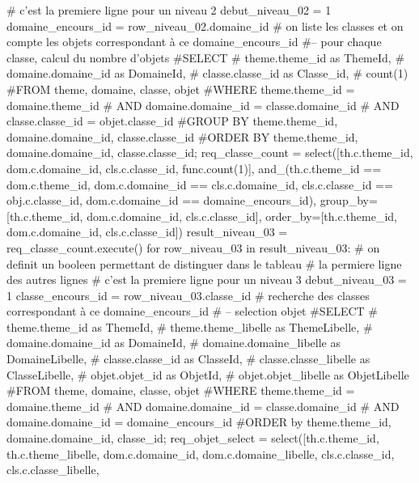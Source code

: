 \documentclass[12pt,titlepage,oneside]{book}
\begin{document}
\begin{lbdpython}
      # c'est la premiere ligne pour un niveau 2
      debut_niveau_02 = 1
      domaine_encours_id = row_niveau_02.domaine_id
      # on liste les classes et on compte les objets correspondant à ce domaine_encours_id
      #-- pour chaque classe, calcul du nombre d'objets
      #SELECT
      #   theme.theme_id as ThemeId,
      #   domaine.domaine_id as DomaineId,
      #   classe.classe_id as Classe_id,
      #   count(1)
      #FROM theme, domaine, classe, objet
      #WHERE theme.theme_id = domaine.theme_id 
      #  AND domaine.domaine_id = classe.domaine_id
      #  AND classe.classe_id = objet.classe_id
      #GROUP BY theme.theme_id, domaine.domaine_id, classe.classe_id
      #ORDER BY theme.theme_id, domaine.domaine_id, classe.classe_id;
      req_classe_count = select([th.c.theme_id, dom.c.domaine_id,
                                 cls.c.classe_id, func.count(1)],
                         and_(th.c.theme_id == dom.c.theme_id,
                              dom.c.domaine_id == cls.c.domaine_id,
                              cls.c.classe_id == obj.c.classe_id,
                              dom.c.domaine_id == domaine_encours_id),
                         group_by=[th.c.theme_id, dom.c.domaine_id, cls.c.classe_id],
                         order_by=[th.c.theme_id, dom.c.domaine_id, cls.c.classe_id])
      result_niveau_03 = req_classe_count.execute()
      for row_niveau_03 in result_niveau_03:
         # on definit un booleen permettant de distinguer dans le tableau
         # la permiere ligne des autres lignes
         # c'est la premiere ligne pour un niveau 3
         debut_niveau_03 = 1
         classe_encours_id = row_niveau_03.classe_id
         # recherche des classes correspondant à ce domaine_encours_id
         # -- selection objet
         #SELECT
         #   theme.theme_id as ThemeId,
         #   theme.theme_libelle as ThemeLibelle,
         #   domaine.domaine_id as DomaineId,
         #   domaine.domaine_libelle as DomaineLibelle,
         #   classe.classe_id as ClasseId,
         #   classe.classe_libelle as ClasseLibelle,
         #   objet.objet_id as ObjetId,
         #   objet.objet_libelle as ObjetLibelle
         #FROM theme, domaine, classe, objet
         #WHERE theme.theme_id = domaine.theme_id
         #  AND domaine.domaine_id = classe.domaine_id
         #  AND domaine.domaine_id = domaine_encours_id
         #ORDER by theme.theme_id, domaine.domaine_id, classe_id;
         req_objet_select = select([th.c.theme_id, th.c.theme_libelle,
                                    dom.c.domaine_id, dom.c.domaine_libelle,
                                    cls.c.classe_id, cls.c.classe_libelle,

\end{lbdpython}
\end{document}
